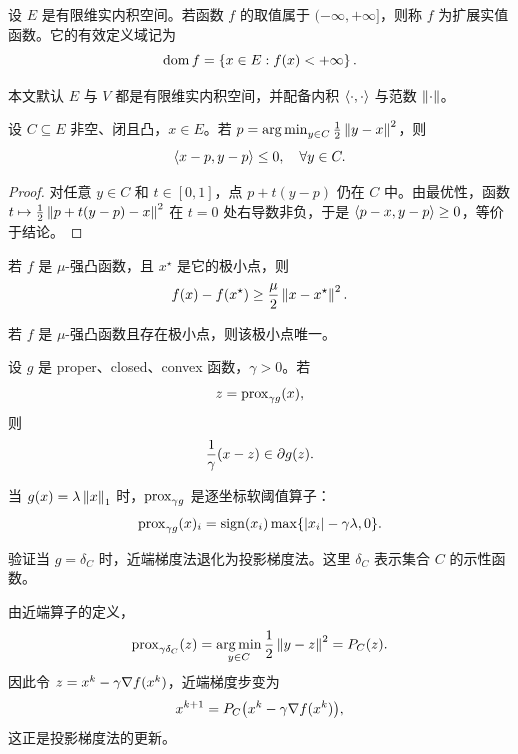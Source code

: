 \documentclass[../main.tex]{subfiles}
\begin{document}
\begin{definition}[扩展实值函数]
设 $E$ 是有限维实内积空间。若函数 $f$ 的取值属于 $(-\infty,+\infty]$，则称 $f$ 为扩展实值函数。它的有效定义域记为
\[
  \operatorname{dom} f = \left\{x\in E: f(x)<+\infty\right\}.
\]
\end{definition}

\begin{assumption}[基本空间]
本文默认 $E$ 与 $V$ 都是有限维实内积空间，并配备内积 $\left\langle \cdot,\cdot \right\rangle$ 与范数 $\left\lVert \cdot \right\rVert$。
\end{assumption}

\begin{theorem}[投影的一阶最优性条件]\label{thm:projection}
设 $C\subseteq E$ 非空、闭且凸，$x\in E$。若
$p=\operatorname*{arg\,min}_{y\in C}\frac12\left\lVert y-x \right\rVert^2$，则
\[
  \left\langle x-p,y-p \right\rangle\le 0,\quad \forall y\in C.
\]

\begin{proof}
对任意 $y\in C$ 和 $t\in[0,1]$，点 $p+t(y-p)$ 仍在 $C$ 中。由最优性，函数
$t\mapsto \frac12\left\lVert p+t(y-p)-x \right\rVert^2$ 在 $t=0$ 处右导数非负，于是 $\left\langle p-x,y-p \right\rangle\ge 0$，等价于结论。
\end{proof}
\end{theorem}

\begin{lemma}[强凸性给出二次下界]
若 $f$ 是 $\mu$-强凸函数，且 $x^\star$ 是它的极小点，则
\[
  f(x)-f(x^\star)\ge \frac{\mu}{2}\left\lVert x-x^\star \right\rVert^2.
\]
\end{lemma}

\begin{corollary}[强凸极小点唯一]
若 $f$ 是 $\mu$-强凸函数且存在极小点，则该极小点唯一。
\end{corollary}

\begin{proposition}[近端点的最优性条件]
设 $g$ 是 proper、closed、convex 函数，$\gamma>0$。若
\[
  z=\operatorname{prox}_{\gamma g}(x),
\]
则
\[
  \frac{1}{\gamma}(x-z)\in \partial g(z).
\]
\end{proposition}

\begin{example}
当 $g(x)=\lambda\left\lVert x \right\rVert_1$ 时，$\operatorname{prox}_{\gamma g}$ 是逐坐标软阈值算子：
\[
  \operatorname{prox}_{\gamma g}(x)_i
  =
  \operatorname{sign}(x_i)\max\{\left\lvert x_i \right\rvert-\gamma\lambda,0\}.
\]
\end{example}

\begin{exercise}
验证当 $g=\delta_C$ 时，近端梯度法退化为投影梯度法。这里 $\delta_C$ 表示集合 $C$ 的示性函数。

\begin{solution}
由近端算子的定义，
\[
  \operatorname{prox}_{\gamma\delta_C}(z)=\operatorname*{arg\,min}_{y\in C}\frac{1}{2}\left\lVert y-z \right\rVert^2=P_C(z).
\]
因此令 $z=x^k-\gamma\nabla f(x^k)$，近端梯度步变为
\[
  x^{k+1}=P_C\bigl(x^k-\gamma\nabla f(x^k)\bigr),
\]
这正是投影梯度法的更新。
\end{solution}
\end{exercise}
\end{document}
